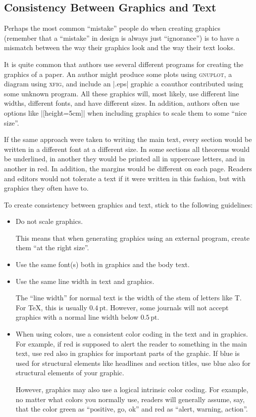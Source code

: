 \subsection{Consistency Between Graphics and Text}

Perhaps the most common ``mistake'' people do when creating graphics (remember
that a ``mistake'' in design is always just ``ignorance'') is to have a
mismatch between the way their graphics look and the way their text looks.

It is quite common that authors use several different programs for creating the
graphics of a paper. An author might produce some plots using \textsc{gnuplot},
a diagram using \textsc{xfig}, and include an |.eps| graphic a coauthor
contributed using some unknown program. All these graphics will, most likely,
use different line widths, different fonts, and have different sizes. In
addition, authors often use options like |[height=5cm]| when including graphics
to scale them to some ``nice size''.

If the same approach were taken to writing the main text, every section would
be written in a different font at a different size. In some sections all
theorems would be underlined, in another they would be printed all in uppercase
letters, and in another in red. In addition, the margins would be different on
each page. Readers and editors would not tolerate a text if it were written in
this fashion, but with graphics they often have to.

To create consistency between graphics and text, stick to the following
guidelines:
%
\begin{itemize}
    \item Do not scale graphics.

        This means that when generating graphics using an external program,
        create them ``at the right size''.
    \item Use the same font(s) both in graphics and the body text.
    \item Use the same line width in text and graphics.

        The ``line width'' for normal text is the width of the stem of letters
        like T{}. For \TeX, this is usually $0.4\,\mathrm{pt}$. However, some
        journals will not accept graphics with a normal line width below
        $0.5\,\mathrm{pt}$.
    \item When using colors, use a consistent color coding in the text and in
        graphics. For example, if red is supposed to alert the reader to
        something in the main text, use red also in graphics for important
        parts of the graphic. If blue is used for structural elements like
        headlines and section titles, use blue also for structural elements
        of your graphic.

        However, graphics may also use a logical intrinsic color
        coding. For example, no matter what colors you normally use, readers
        will generally assume, say, that the color green as ``positive, go,
        ok'' and red as ``alert, warning, action''.
\end{itemize}

